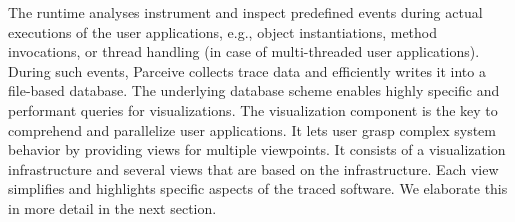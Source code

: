The runtime analyses instrument and inspect predefined events during actual
executions of the user applications, e.g., object instantiations, method
invocations, or thread handling (in case of multi-threaded user applications).
During such events, Parceive collects trace data and efficiently writes it into
a file-based database. The underlying database scheme enables highly specific
and performant queries for visualizations. The visualization component is the
key to comprehend and parallelize user applications. It lets user grasp complex
system behavior by providing views for multiple viewpoints. It consists of a
visualization infrastructure and several views that are based on the
infrastructure. Each view simplifies and highlights specific aspects of the
traced software. We elaborate this in more detail in the next section.